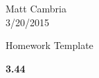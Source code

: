 \documentclass[12pt,oneside]{article}
\newenvironment{exercise}[1]{\vspace{.5cm}\noindent\textbf{#1 \hspace{.05em}}}{}
\begin{document}
\setlength{\belowdisplayskip}{5pt} \setlength{\belowdisplayshortskip}{0pt}
\setlength{\abovedisplayskip}{-10pt} \setlength{\abovedisplayshortskip}{0pt}

\begin{flushright}
Matt Cambria\\
3/20/2015\\
\end{flushright}

\begin{center}
Homework Template\\
\end{center}


\begin{exercise}{3.44}
\end{exercise}

\begin{flushleft}



\end{flushleft} 



\end{document}
